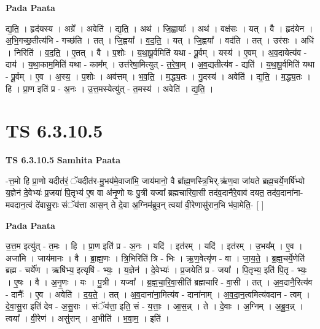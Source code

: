 \documentclass[17pt]{extarticle}
\begin{document}
\textbf{Pada Paata} \newline

द्य॒ति॒ । हृद॑यस्य । अग्रे᳚ । अवेति॑ । द्य॒ति॒ । अथ॑ । जि॒ह्वायाः᳚ । अथ॑ । वक्ष॑सः । यत् । वै । हृद॑येन । अ॒भि॒गच्छ॒तीत्य॑भि - गच्छ॑ति । तत् । जि॒ह्वया᳚ । व॒द॒ति॒ । यत् । जि॒ह्वया᳚ । वद॑ति । तत् । उर॑सः । अधि॑ । निरिति॑ । व॒द॒ति॒ । ए॒तत् । वै । प॒शोः । य॒था॒पू॒र्वमिति॑ यथा - पू॒र्वम् । यस्य॑ । ए॒वम् । अ॒व॒दायेत्य॑व - दाय॑ । य॒था॒काम॒मिति॑ यथा - काम᳚म् । उत्त॑रेषा॒मित्युत् - त॒रे॒षा॒म् । अ॒व॒द्यतीत्य॑व - द्यति॑ । य॒था॒पू॒र्वमिति॑ यथा - पू॒र्वम् । ए॒व । अ॒स्य॒ । प॒शोः । अव॑त्तम् । भ॒व॒ति॒ । म॒द्ध्य॒तः । गु॒दस्य॑ । अवेति॑ । द्य॒ति॒ । म॒द्ध्य॒तः । हि । प्रा॒ण इति॑ प्र - अ॒नः । उ॒त्त॒मस्येत्यु॑त् - त॒मस्य॑ । अवेति॑ । द्य॒ति॒ ।  \newline





\section{ TS 6.3.10.5 }

\textbf{TS 6.3.10.5 } \newline
\textbf{Samhita Paata} \newline

-त्त॒मो हि प्रा॒णो यदीत॑रं॒ ॅयदीत॑र-मु॒भय॑मे॒वाजा॑मि॒ जाय॑मानो॒ वै ब्रा᳚ह्म॒णस्त्रि॒भिर्.ऋ॑ण॒वा जा॑यते ब्रह्म॒चर्ये॒णर्षि॑भ्यो य॒ज्ञेन॑ दे॒वेभ्यः॑ प्र॒जया॑ पि॒तृभ्य॑ ए॒ष वा अ॑नृ॒णो यः पु॒त्री यज्वा᳚ ब्रह्मचारिवा॒सी तद॑व॒दानै॑रे॒वाव॑ दयत॒ तद॑व॒दाना॑ना-मवदान॒त्वं दे॑वासु॒राः संॅय॑त्ता आस॒न् ते दे॒वा अ॒ग्निम॑ब्रुव॒न् त्वया॑ वी॒रेणासु॑रान॒भि भ॑वा॒मेति॒- [  ] \newline

\textbf{Pada Paata} \newline

उ॒त्त॒म इत्यु॑त् - त॒मः । हि । प्रा॒ण इति॑ प्र - अ॒नः । यदि॑ । इत॑रम् । यदि॑ । इत॑रम् । उ॒भय᳚म् । ए॒व । अजा॑मि । जाय॑मानः । वै । ब्रा॒ह्म॒णः । त्रि॒भिरिति॑ त्रि - भिः । ऋ॒ण॒वेत्यृ॑ण - वा । जा॒य॒ते॒ । ब्र॒ह्म॒चर्ये॒णेति॑ ब्रह्म - चर्ये॑ण । ऋषि॑भ्य॒ इत्यृषि॑ - भ्यः॒ । य॒ज्ञेन॑ । दे॒वेभ्यः॑ । प्र॒जयेति॑ प्र - जया᳚ । पि॒तृभ्य॒ इति॑ पि॒तृ - भ्यः॒ । ए॒षः । वै । अ॒नृ॒णः । यः । पु॒त्री । यज्वा᳚ । ब्र॒ह्म॒चा॒रि॒वा॒सीति॑ ब्रह्मचारि - वा॒सी । तत् । अ॒व॒दानै॒रित्य॑व - दानैः᳚ । ए॒व । अवेति॑ । द॒य॒ते॒ । तत् । अ॒व॒दाना॑ना॒मित्य॑व - दाना॑नाम् । अ॒व॒दा॒न॒त्वमित्य॑वदान - त्वम् । दे॒वा॒सु॒रा इति॑ देव - अ॒सु॒राः । संॅय॑त्ता॒ इति॒ सं - य॒त्ताः॒ । आ॒स॒न्न् । ते । दे॒वाः । अ॒ग्निम् । अ॒ब्रु॒व॒न्न् । त्वया᳚ । वी॒रेण॑ । असु॑रान् । अ॒भीति॑ । भ॒वा॒म॒ । इति॑ ।  \newline
\end{document}
